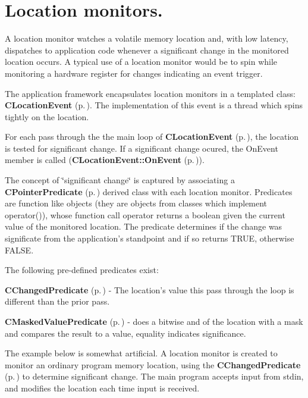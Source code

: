 \section{Location monitors.}\label{LocationMonitors}


A location monitor watches a volatile memory location and, with low latency, dispatches to application code whenever a significant change in the monitored location occurs. A typical use of a location monitor would be to spin while monitoring a hardware register for changes indicating an event trigger.

The application framework encapsulates location monitors in a templated class: {\bf CLocation\-Event} {\rm (p.\,\pageref{classCLocationEvent})}. The implementation of this event is a thread which spins tightly on the location.

For each pass through the the main loop of {\bf CLocation\-Event} {\rm (p.\,\pageref{classCLocationEvent})}, the location is  tested for significant change. If a significant change ocured, the On\-Event member is called ({\bf CLocation\-Event::On\-Event} {\rm (p.\,\pageref{classCEvent_b2})}).

The concept of \char`\"{}significant change\char`\"{} is captured by associating a  {\bf CPointer\-Predicate} {\rm (p.\,\pageref{classCPointerPredicate})} derived class with each location monitor. Predicates are  function like objects (they are objects from classes which implement  operator()), whose function call operator returns a boolean given the current value of the monitored location. The predicate determines if the change was significate from the application's standpoint and if so returns TRUE, otherwise FALSE.

The following pre-defined predicates exist:\begin{CompactItemize}
\item 
{\bf CChanged\-Predicate} {\rm (p.\,\pageref{classCChangedPredicate})} - The location's value this pass through the loop is  different than the prior pass.\item 
{\bf CMasked\-Value\-Predicate} {\rm (p.\,\pageref{classCMaskedValuePredicate})} - does a bitwise and of the location with a mask and compares the result to a value, equality indicates significance.\end{CompactItemize}
The example below is somewhat artificial. A location monitor is created to monitor an ordinary program memory location, using the {\bf CChanged\-Predicate} {\rm (p.\,\pageref{classCChangedPredicate})} to  determine significant change. The main program accepts input from stdin, and modifies the location each time input is received.

